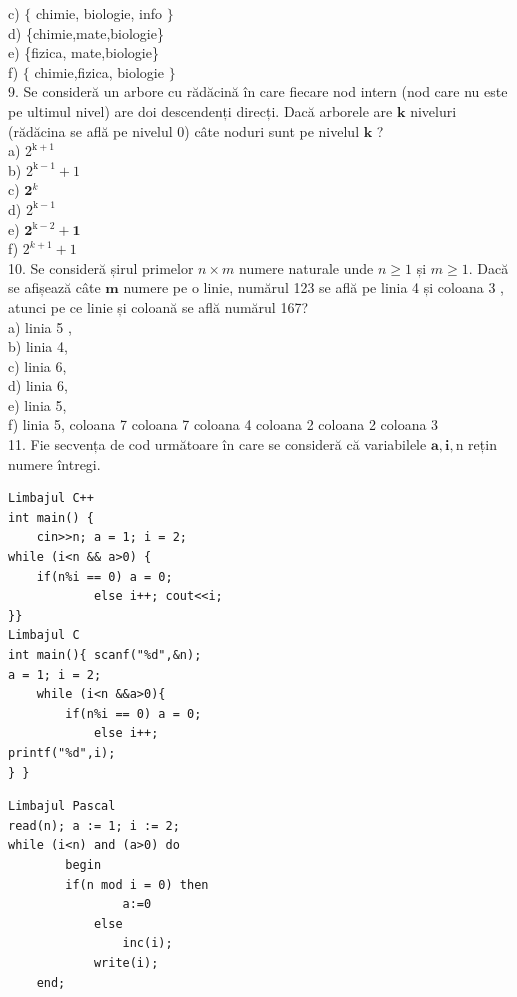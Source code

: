 \documentclass[10pt]{article}
\begin{document}
c) $\{$ chimie, biologie, info $\}$\\
d) \{chimie,mate,biologie\}\\
e) \{fizica, mate,biologie\}\\
f) $\{$ chimie,fizica, biologie $\}$\\
9. Se consideră un arbore cu rădăcină în care fiecare nod intern (nod care nu este pe ultimul nivel) are doi descendenți direcți. Dacă arborele are $\mathbf{k}$ niveluri (rădăcina se află pe nivelul 0) câte noduri sunt pe nivelul $\mathbf{k}$ ?\\
a) $2^{\mathrm{k}+1}$\\
b) $2^{\mathrm{k}-1}+1$\\
c) $\mathbf{2}^{k}$\\
d) $2^{\mathrm{k}-1}$\\
e) $\mathbf{2}^{\mathrm{k}-2}+\mathbf{1}$\\
f) $2^{k+1}+1$\\
10. Se consideră șirul primelor $n \times m$ numere naturale unde $n \geq 1$ și $m \geq 1$. Dacă se afișează câte $\mathbf{m}$ numere pe o linie, numărul 123 se află pe linia 4 și coloana 3 , atunci pe ce linie și coloană se află numărul 167?\\
a) linia 5 ,\\
b) linia 4,\\
c) linia 6,\\
d) linia 6,\\
e) linia 5,\\
f) linia 5, coloana 7 coloana 7 coloana 4 coloana 2 coloana 2 coloana 3\\
11. Fie secvența de cod următoare în care se consideră că variabilele $\mathbf{a}, \mathbf{i}, \mathrm{n}$ rețin numere întregi.

\begin{verbatim}
Limbajul C++
int main() {
    cin>>n; a = 1; i = 2;
while (i<n && a>0) {
    if(n%i == 0) a = 0;
            else i++; cout<<i;
}}
Limbajul C
int main(){ scanf("%d",&n);
a = 1; i = 2;
    while (i<n &&a>0){
        if(n%i == 0) a = 0;
            else i++;
printf("%d",i);
} }
\end{verbatim}

\begin{verbatim}
Limbajul Pascal
read(n); a := 1; i := 2;
while (i<n) and (a>0) do
        begin
        if(n mod i = 0) then
                a:=0
            else
                inc(i);
            write(i);
    end;
\end{verbatim}
\end{document}
